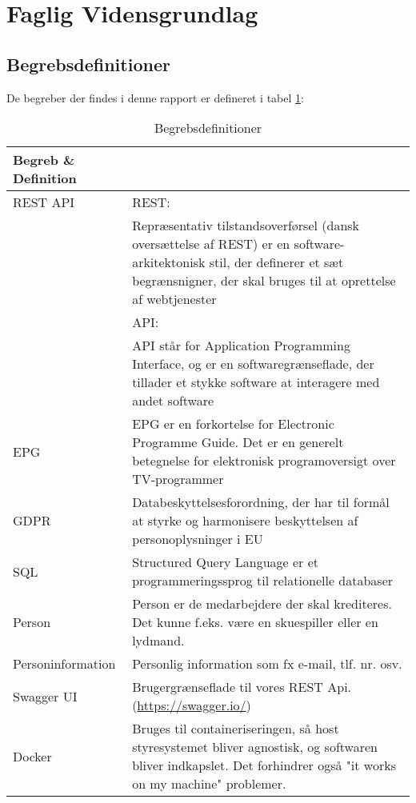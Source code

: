 \section{Faglig Vidensgrundlag}

\subsection{Begrebsdefinitioner} 
De begreber der findes i denne rapport er defineret i tabel \ref{tab:Begrebsdefinitioner}:

\begin{table}[h]
    \centering
\begin{tabular}{|p{4cm}|p{12cm}|}
\hline
\textbf{Begreb} \& \textbf{Definition} \\
\hline
REST API    & REST: \\
            & Repræsentativ tilstandsoverførsel (dansk oversættelse af REST) er en software-arkitektonisk stil, der definerer et sæt begrænsnigner, der skal bruges til at oprettelse af webtjenester\\
            & API: \\
            & API står for Application Programming Interface, og er en softwaregrænseflade, der tillader et stykke software at interagere med andet software \\
\hline
EPG         & EPG er en forkortelse for Electronic Programme Guide. Det er en generelt betegnelse for elektronisk programoversigt over TV-programmer         \\
\hline
GDPR        & Databeskyttelsesforordning, der har til formål at styrke og harmonisere beskyttelsen af personoplysninger i EU \\
\hline
SQL         & Structured Query Language er et programmeringssprog til relationelle databaser\\
\hline
Person & Person er de medarbejdere der skal krediteres. Det kunne f.eks. være en skuespiller eller en lydmand. \\
\hline
Personinformation & Personlig information som fx e-mail, tlf. nr. osv. \\
\hline
Swagger UI  & Brugergrænseflade til vores REST Api. (\url{https://swagger.io/}) \\
\hline
Docker      & Bruges til containeriseringen, så host styresystemet bliver agnostisk, og softwaren bliver indkapslet. Det forhindrer også "it works on my machine" problemer.  \\
\hline
 \end{tabular}
    \caption{Begrebsdefinitioner}
    \label{tab:Begrebsdefinitioner}
\end{table}


